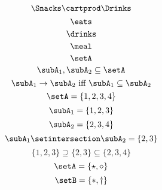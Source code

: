 {\begin{forslides}
        \begin{equation}
            \label{eq:prod-slides-9}
            \Snacks \cartprod \Drinks
        \end{equation}
        \begin{equation}
            \label{eq:prod-slides-10}
            \eats
        \end{equation}
        \begin{equation}
            \label{eq:prod-slides-11}
            \drinks
        \end{equation}
        \begin{equation}
            \label{eq:prod-slides-12}
            \meal
        \end{equation}
        \begin{equation}
            \label{eq:prod-slides-13}
            \setA
        \end{equation}
        \begin{equation}
            \label{eq:prod-slides-14}
            \subA_1, \subA_2 \subseteq \setA
        \end{equation}
        \begin{equation}
            \label{eq:prod-slides-15}
            \subA_1 \to \subA_2 \text{ iff } \subA_1 \subseteq \subA_2
        \end{equation}
        \begin{equation}
            \label{eq:prod-slides-16}
            \setA = \{ 1, 2, 3, 4 \}
        \end{equation}
        \begin{equation}
            \label{eq:prod-slides-17}
            \subA_1 = \{ 1, 2, 3 \}
        \end{equation}
        \begin{equation}
            \label{eq:prod-slides-18}
            \subA_2 = \{2, 3, 4 \}
        \end{equation}
        \begin{equation}
            \label{eq:prod-slides-19}
            \subA_1 \setintersection \subA_2 = \{2, 3 \}
        \end{equation}
        \begin{equation}
            \label{eq:prod-slides-20}
            \{ 1, 2, 3 \} \supseteq \{2, 3 \} \subseteq \{2, 3, 4 \}
        \end{equation}
        \begin{equation}
            \label{eq:coprod-slides-1}
            \setA=\{\star, \diamond\}
        \end{equation}
        \begin{equation}
            \label{eq:coprod-slides-2}
            \setB=\{\ast, \dagger\}
        \end{equation}
    \end{forslides}
}

